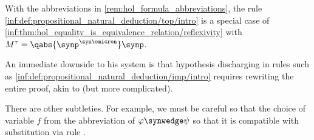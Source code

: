 \begin{remark}
  With the abbreviations in \ref{rem:hol_formula_abbreviations}, the rule \ref{inf:def:propositional_natural_deduction/top/intro} is a special case of \ref{inf:thm:hol_equality_is_equivalence_relation/reflexivity} with \( M^\tau = \qabs {\synp^{\syn\omicron}} \synp \).

  An immediate downside to his system is that hypothesis discharging in rules such as \ref{inf:def:propositional_natural_deduction/imp/intro} requires rewriting the entire proof, akin to  (but more complicated).

  There are other subtleties. For example, we must be careful so that the choice of variable \( f \) from the abbreviation of \( \varphi \synwedge \psi \) so that it is compatible with substitution via rule .
\end{remark}

